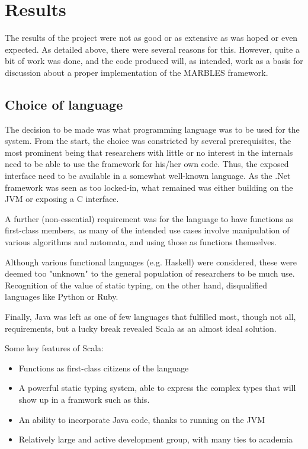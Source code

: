 \section{Results}

The results of the project were not as good or as extensive as was hoped or
even expected. As detailed above, there were several reasons for this.
However, quite a bit of work was done, and the code produced will, as
intended, work as a basis for discussion about a proper implementation of
the MARBLES framework.

\subsection{Choice of language}

The decision to be made was what programming language was to be used for
the system. From the start, the choice was constricted by several
prerequisites, the most prominent being that researchers with little or no
interest in the internals need to be able to use the framework for his/her
own code. Thus, the exposed interface need to be available in a somewhat
well-known language. As the .Net framework was seen as too locked-in, what
remained was either building on the JVM or exposing a C interface.

A further (non-essential) requirement was for the language to have
functions as first-class members, as many of the intended use cases involve
manipulation of various algorithms and automata, and using those as
functions themselves.

Although various functional languages (e.g. Haskell) were considered, these
were deemed too "unknown" to the general population of researchers to be
much use. Recognition of the value of static typing, on the other hand,
disqualified languages like Python or Ruby.

Finally, Java was left as one of few languages that fulfilled most, though
not all, requirements, but a lucky break revealed Scala as an almost ideal
solution.

Some key features of Scala:

\begin{itemize}
\item Functions as first-class citizens of the language
\item A powerful static typing system, able to express the complex types
that will show up in a framwork such as this.
\item An ability to incorporate Java code, thanks to running on the JVM
\item Relatively large and active development group, with many ties to
academia
\end{itemize}

